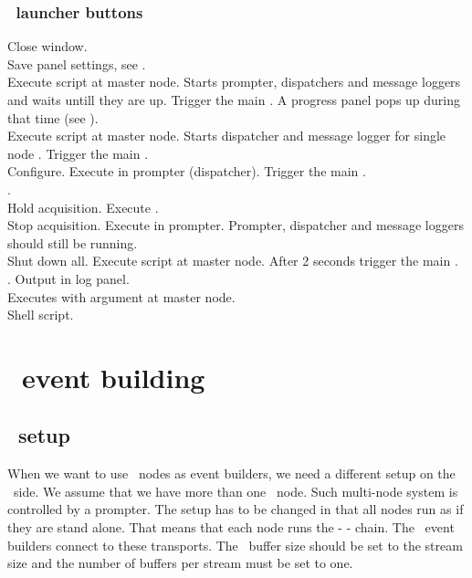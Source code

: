 {\subsubsection{\mbs\ launcher buttons}
 Close window.\\
 Save panel settings, see .\\
  Execute script  at master node.
Starts prompter, dispatchers and message loggers and waits untill they are up.
Trigger the main .
A progress panel pops up during that time (see ).\\
 Execute script  at master node.
Starts dispatcher and message logger for single node \mbs.
Trigger the main .\\
 Configure. Execute  in prompter (dispatcher).
Trigger the main .\\
 .\\
 Hold acquisition. Execute .\\
 Stop acquisition. Execute  in prompter.
Prompter, dispatcher and message loggers should still be running.\\
 Shut down all. Execute script  at master node.
After 2 seconds trigger the main .\\
 . Output in log panel.\\
 Executes  with argument  at master node.\\
 Shell script.

\section{\dabc\ event building}
\subsection{\mbs\ setup}
When we want to use \dabc\ nodes as event builders, we need a different
setup on the \mbs\ side. We assume that we have more than one
\mbs\ node. Such multi-node system is controlled by a prompter.
The setup has to be changed in that all nodes run as if they are stand alone.
That means that each node runs the  -  - 
chain. The \dabc\ event builders connect to these transports.
The \mbs\ buffer size should be set to the stream size and the number of buffers per
stream must be set to one.
}
